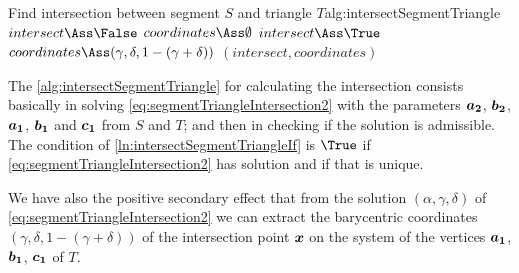 \documentclass[dissertation.tex]{subfiles}
\begin{document}
\begin{algo}{Find intersection between segment $S$ and triangle $T$}{alg:intersectSegmentTriangle}
  \State $intersect\Ass\False$
  \State $coordinates\Ass\emptyset$
  \label{ln:intersectSegmentTriangleIf}
  \State $intersect\Ass\True$
  \State $coordinates\Ass(\gamma, \delta, 1-(\gamma+\delta))$
  \EndIf
  \EndIf
  \State\Return $(intersect, coordinates)$
  \EndFunction
\end{algo}
The \cref{alg:intersectSegmentTriangle} for calculating the
intersection consists basically in solving
\cref{eq:segmentTriangleIntersection2} with the parameters $\boldsymbol{a_2}$,
$\boldsymbol{b_2}$, $\boldsymbol{a_1}$, $\boldsymbol{b_1}$ and $\boldsymbol{c_1}$ from $S$ and $T$;
and then in checking if the solution is admissible. The condition of
\cref{ln:intersectSegmentTriangleIf} is $\True$ if
\cref{eq:segmentTriangleIntersection2} has solution and if that
is unique.

We have also the positive secondary effect that from the solution
$(\alpha,\gamma,\delta)$ of \cref{eq:segmentTriangleIntersection2} we
can extract the barycentric coordinates $(\gamma, \delta,
1-(\gamma+\delta))$ of the intersection point $\boldsymbol{x}$ on the system of
the vertices $\boldsymbol{a_1}$, $\boldsymbol{b_1}$, $\boldsymbol{c_1}$ of $T$.
\end{document}

